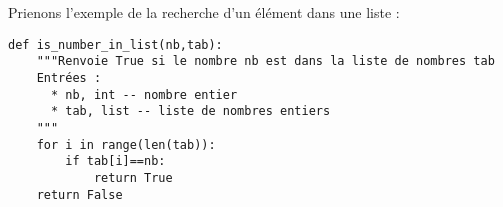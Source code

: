 Prienons l'exemple de la recherche d'un élément dans une liste : 


\noindent
\begin{minipage}[c]{.49\linewidth}
%

\begin{lstlisting}
def is_number_in_list(nb,tab):
    """Renvoie True si le nombre nb est dans la liste de nombres tab
    Entrées :
      * nb, int -- nombre entier
      * tab, list -- liste de nombres entiers    
    """
    for i in range(len(tab)):
        if tab[i]==nb:
            return True
    return False
\end{lstlisting}



\end{minipage}
